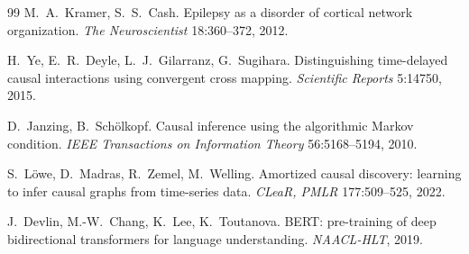 \documentclass[11pt]{article}
\begin{document}
\begin{thebibliography}{99}
 M.~A.~Kramer, S.~S.~Cash. Epilepsy as a disorder of
cortical network organization. \emph{The Neuroscientist} 18:360--372,
2012.

 H.~Ye, E.~R.~Deyle, L.~J.~Gilarranz, G.~Sugihara.
Distinguishing time-delayed causal interactions using convergent cross
mapping. \emph{Scientific Reports} 5:14750, 2015.

 D.~Janzing, B.~Sch\"olkopf.
Causal inference using the algorithmic Markov condition.
\emph{IEEE Transactions on Information Theory} 56:5168--5194, 2010.

 S.~L\"owe, D.~Madras, R.~Zemel, M.~Welling.
Amortized causal discovery: learning to infer causal graphs from
time-series data. \emph{CLeaR, PMLR} 177:509--525, 2022.

 J.~Devlin, M.-W.~Chang, K.~Lee, K.~Toutanova.
BERT: pre-training of deep bidirectional transformers for language
understanding. \emph{NAACL-HLT}, 2019.

\end{thebibliography}
\end{document}
